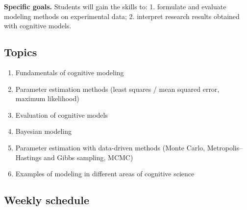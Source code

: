 \textbf{Specific goals.} Students will gain the skills to: 1. formulate and evaluate
modeling methods on experimental data; 2. interpret research results
obtained with cognitive models.

\subsection{Topics}

\begin{enumerate}
\def\labelenumi{\arabic{enumi}.}
\tightlist
\item
  Fundamentals of cognitive modeling
\item
  Parameter estimation methods (least squares / mean squared error,
  maximum likelihood)
\item
  Evaluation of cognitive models
\item
  Bayesian modeling
\item
  Parameter estimation with data-driven methods (Monte Carlo,
  Metropolis--Hastings and Gibbs sampling, MCMC)
\item
  Examples of modeling in different areas of cognitive science
\end{enumerate}

\subsection{Weekly schedule}


